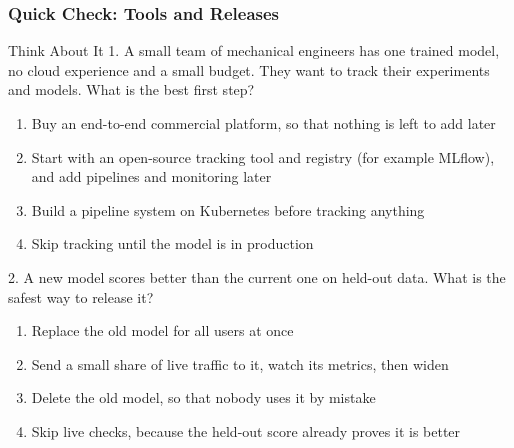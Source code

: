 \begin{frame}[fragile]\frametitle{Quick Check: Tools and Releases}
\begin{block}{Think About It}
1. A small team of mechanical engineers has one trained model, no cloud experience and a small budget. They want to track their experiments and models. What is the best first step?
\begin{enumerate}
  \item[A.] Buy an end-to-end commercial platform, so that nothing is left to add later
  \item[B.] Start with an open-source tracking tool and registry (for example MLflow), and add pipelines and monitoring later
  \item[C.] Build a pipeline system on Kubernetes before tracking anything
  \item[D.] Skip tracking until the model is in production
\end{enumerate}
2. A new model scores better than the current one on held-out data. What is the safest way to release it?
\begin{enumerate}
  \item[A.] Replace the old model for all users at once
  \item[B.] Send a small share of live traffic to it, watch its metrics, then widen
  \item[C.] Delete the old model, so that nobody uses it by mistake
  \item[D.] Skip live checks, because the held-out score already proves it is better
\end{enumerate}
\end{block}
\end{frame}

